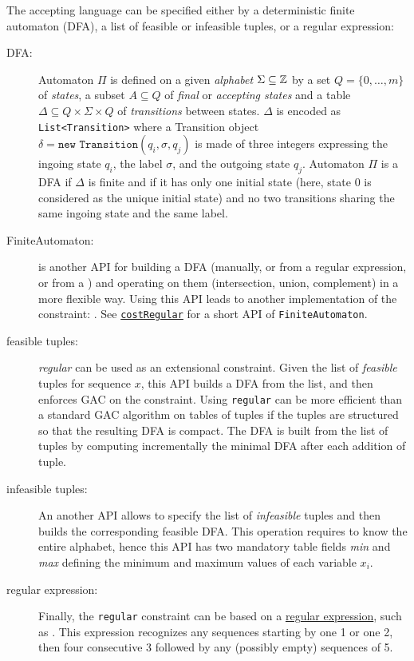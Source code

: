 The accepting language can be specified either by a deterministic finite automaton (DFA), a list of feasible or infeasible tuples, or a regular expression:
\begin{description}
\item[DFA:] Automaton $\Pi$ is defined on a given \emph{alphabet} $\Sigma\subseteq\mathbb{Z}$ by a set $Q=\{0,\ldots,m\}$ of \emph{states}, a subset $A\subseteq Q$ of \emph{final} or \emph{accepting states} and a table $\Delta\subseteq Q\!\times\!\Sigma\!\times Q$ of \emph{transitions} between states. $\Delta$ is encoded as \texttt{List<Transition>} where a Transition object $\delta=\texttt{new Transition}(q_i,\sigma,q_j)$ is made of three integers expressing the ingoing state $q_i$, the label $\sigma$, and the outgoing state $q_j$.
Automaton $\Pi$ is a DFA if $\Delta$ is finite and if it has only one initial state (here, state $0$ is considered as the unique initial state) and no two transitions sharing the same ingoing state and the same label.
\item[FiniteAutomaton:] is another API for building a DFA (manually, or from a regular expression, or from a ) and operating on them (intersection, union, complement) in a more flexible way. Using this API leads to another implementation of the constraint: . See \hyperlink{costregular}{\texttt{costRegular}} for a short API of \texttt{FiniteAutomaton}. 
\item[feasible tuples:] \emph{regular} can be used as an extensional constraint. Given the list of \emph{feasible} tuples for sequence $x$, this API builds a DFA from the list, and then enforces GAC on the constraint. Using \texttt{regular} can be more efficient than a standard GAC algorithm on tables of tuples if the tuples are structured so that the resulting DFA is compact. The DFA is built from the list of tuples by computing incrementally the minimal DFA after each addition of tuple. 
\item[infeasible tuples:] An another API allows to specify the list of \emph{infeasible} tuples and then builds the corresponding feasible DFA. This operation requires to know the entire alphabet, hence this API has two mandatory table fields \emph{min} and \emph{max} defining the minimum and maximum values of each variable $x_i$.
\item[regular expression:] Finally, the \texttt{regular} constraint can be based on a \href{http://en.wikipedia.org/wiki/regularexpression}{regular expression}, such as . This expression recognizes any sequences starting by one 1 or one 2, then four consecutive 3 followed by any (possibly empty) sequences of 5.
\end{description}

